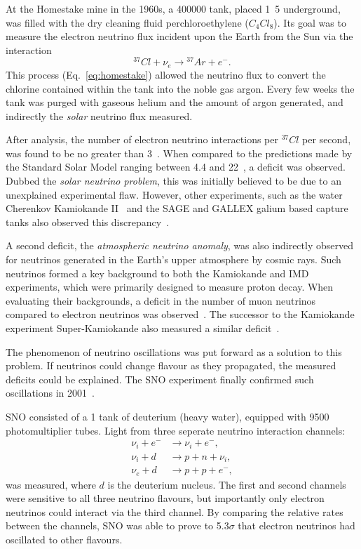 At the Homestake mine in the 1960s, a \unit{400000}{} tank, placed
\unit{1.5}{} underground, was filled with the dry cleaning fluid perchloroethylene
($C_{4}Cl_{8}$). Its goal was to measure the electron neutrino flux incident upon the Earth from
the Sun via the interaction
\begin{equation} %
    {}^{37}Cl+\nu_{e}\rightarrow{}^{37}Ar+e^{-}.
    \label{eq:homestake}
\end{equation} %
This process (Eq.~\ref{eq:homestake}) allowed the neutrino flux to convert the chlorine contained
within the tank into the noble gas argon. Every few weeks the tank was purged with gaseous helium
and the amount of argon generated, and indirectly the \emph{solar} neutrino flux measured.

After analysis, the number of electron neutrino interactions per ${}^{37}Cl$ per second, was found
to be no greater than 3~\cite{davis1968}. When compared to the predictions made by the Standard
Solar Model ranging between 4.4 and 22~\cite{bahcall1968}, a deficit was observed. Dubbed the
\emph{solar neutrino problem}, this was initially believed to be due to an unexplained
experimental flaw. However, other experiments, such as the water Cherenkov Kamiokande
II~\cite{hirata1989} and the SAGE and GALLEX galium based capture tanks also observed this
discrepancy~\cite{abazov1991, anselmann1994}.

A second deficit, the \emph{atmospheric neutrino anomaly}, was also indirectly observed for
neutrinos generated in the Earth's upper atmosphere by cosmic rays. Such neutrinos formed a key
background to both the Kamiokande and IMD experiments, which were primarily designed to measure
proton decay. When evaluating their backgrounds, a deficit in the number of muon neutrinos
compared to electron neutrinos was observed~\cite{hirata1988, becker1992}. The successor to the
Kamiokande experiment Super-Kamiokande also measured a similar deficit~\cite{kajita1999}.

The phenomenon of neutrino oscillations was put forward as a solution to this problem. If
neutrinos could change flavour as they propagated, the measured deficits could be explained. The
SNO experiment finally confirmed such oscillations in 2001~\cite{ahmad2002}.

SNO consisted of a \unit{1}{} tank of deuterium (heavy water), equipped with 9500
photomultiplier tubes. Light from three seperate neutrino interaction channels:
\begin{align} %
    \nu_{i}+e^{-} & \rightarrow \nu_{i}+e^{-}, \\
    \nu_{i}+d     & \rightarrow p+n+\nu_{i},   \\
    \nu_{e}+d     & \rightarrow p+p+e^{-},
\end{align}
was measured, where $d$ is the deuterium nucleus. The first and second channels were sensitive to
all three neutrino flavours, but importantly only electron neutrinos could interact via the third
channel. By comparing the relative rates between the channels, SNO was able to prove to
5.3$\sigma$ that electron neutrinos had oscillated to other flavours.

